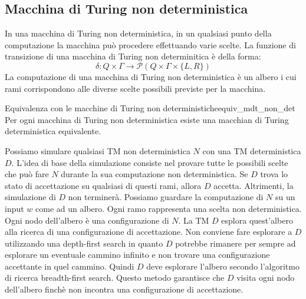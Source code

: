 \documentclass[12pt]{report}
\newcounter{theorem}
\newcommand{\nmu}{}
\begin{document}
\subsection{Macchina di Turing non deterministica}
In una macchina di Turing non deterministica, in un qualsiasi punto della computazione la macchina può procedere effettuando varie scelte. La funzione di transizione di una macchina di Turing non determinitica è della forma:
\[
\delta: Q \times \Gamma \to \mathcal{P}(Q \times \Gamma \times \{L, R\})
\]
La computazione di una macchina di Turing non deterministica è un albero i cui rami corrispondono alle diverse scelte possibili previste per la macchina.
\begin{theorem}{\nmu Equivalenza con le macchine di Turing non deterministiche}{equiv_mdt_non_det}
	Per ogni macchina di Turing non deterministica esiste una macchian di Turing deterministica equivalente.
\end{theorem}
Possiamo simulare qualsiasi TM non deterministica $N$ con una TM deterministica $D$. L'idea di base della simulazione consiste nel provare tutte le possibili scelte che può fare $N$ durante la sua computazione non deterministica. Se $D$ trova lo stato di accettazione su qualsiasi di questi rami, allora $D$ accetta. Altrimenti, la simulazione di $D$ non terminerà. Possiamo guardare la computazione di $N$ su un input $w$ come ad un albero. Ogni ramo rappresenta una scelta non deterministica. Ogni nodo dell'albero è una configurazione di $N$. La TM $D$ esplora quest'albero alla ricerca di una configurazione di accettazione. Non conviene fare esplorare a $D$ utilizzando una depth-first search in quanto $D$ potrebbe rimanere per sempre ad esplorare un eventuale cammino infinito e non trovare una configurazione accettante in quel cammino. Quindi $D$ deve esplorare l'albero secondo l'algoritmo di ricerca breadth-first search. Questo metodo garantisce che $D$ visita ogni nodo dell'albero finchè non incontra una configurazione di accettazione.
\end{document}
